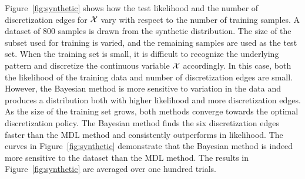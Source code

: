 Figure~\ref{fig:synthetic} shows how the test likelihood and the number of discretization edges for $\mathcal{X}$ vary with respect to the number of training samples.
A dataset of \num{800} samples is drawn from the synthetic distribution.
The size of the subset used for training is varied, and the remaining samples are used as the test set.
When the training set is small, it is difficult to recognize the underlying pattern and discretize the continuous variable $\mathcal{X}$ accordingly.
In this case, both the likelihood of the training data and number of discretization edges are small.
However, the Bayesian method is more sensitive to variation in the data and produces a distribution both with higher likelihood and more discretization edges.
As the size of the training set grows, both methods converge towards the optimal discretization policy.
The Bayesian method finds the six discretization edges faster than the MDL method and consistently outperforms in likelihood.
The curves in Figure~\ref{fig:synthetic} demonstrate that the Bayesian method is indeed more sensitive to the dataset than the MDL method.
The results in Figure~\ref{fig:synthetic} are averaged over one hundred trials.



